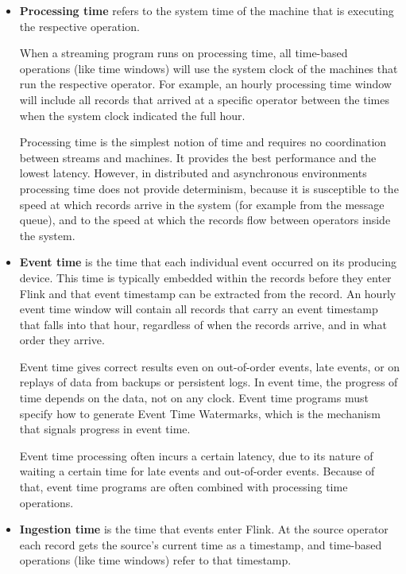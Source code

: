 \begin{itemize}
    \item \textbf{Processing time} refers to the system time of the machine that is executing the respective operation.
    
    When a streaming program runs on processing time, all time-based operations (like time windows) will use the system clock of the machines that run the respective operator. For example, an hourly processing time window will include all records that arrived at a specific operator between the times when the system clock indicated the full hour.
    
    Processing time is the simplest notion of time and requires no coordination between streams and machines. It provides the best performance and the lowest latency. However, in distributed and asynchronous environments processing time does not provide determinism, because it is susceptible to the speed at which records arrive in the system (for example from the message queue), and to the speed at which the records flow between operators inside the system.
    
    \item \textbf{Event time} is the time that each individual event occurred on its producing device. This time is typically embedded within the records before they enter Flink and that event timestamp can be extracted from the record. An hourly event time window will contain all records that carry an event timestamp that falls into that hour, regardless of when the records arrive, and in what order they arrive.
    
    Event time gives correct results even on out-of-order events, late events, or on replays of data from backups or persistent logs. In event time, the progress of time depends on the data, not on any clock. Event time programs must specify how to generate Event Time Watermarks, which is the mechanism that signals progress in event time.
    
    Event time processing often incurs a certain latency, due to its nature of waiting a certain time for late events and out-of-order events. Because of that, event time programs are often combined with processing time operations.
    
    \item \textbf{Ingestion time} is the time that events enter Flink. At the source operator each record gets the source’s current time as a timestamp, and time-based operations (like time windows) refer to that timestamp.
    

\end{itemize}
